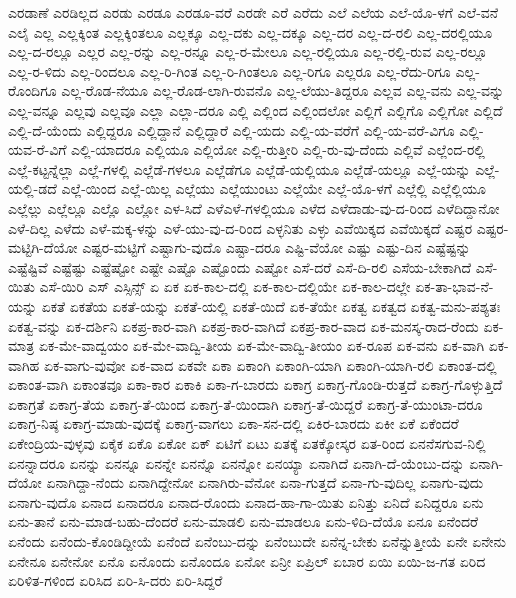 {ಎರಡಾಣೆ
ಎರಡಿಲ್ಲದ
ಎರಡು
ಎರಡೂ
ಎರಡೂ-ವರೆ
ಎರಡೇ
ಎರೆ
ಎರೆದು
ಎಲೆ
ಎಲೆಯ
ಎಲೆ-ಯೊ-ಳಗೆ
ಎಲೆ-ವನೆ
ಎಲೈ
ಎಲ್ಲ
ಎಲ್ಲಕ್ಕಿಂತ
ಎಲ್ಲಕ್ಕಿಂತಲೂ
ಎಲ್ಲಕ್ಕೂ
ಎಲ್ಲ-ದಕು
ಎಲ್ಲ-ದಕ್ಕೂ
ಎಲ್ಲ-ದರ
ಎಲ್ಲ-ದ-ರಲಿ
ಎಲ್ಲ-ದರಲ್ಲಿಯೂ
ಎಲ್ಲ-ದ-ರಲ್ಲೂ
ಎಲ್ಲರ
ಎಲ್ಲ-ರನ್ನು
ಎಲ್ಲ-ರನ್ನೂ
ಎಲ್ಲ-ರ-ಮೇಲೂ
ಎಲ್ಲ-ರಲ್ಲಿಯೂ
ಎಲ್ಲ-ರಲ್ಲಿ-ರುವ
ಎಲ್ಲ-ರಲ್ಲೂ
ಎಲ್ಲ-ರ-ಳಿದು
ಎಲ್ಲ-ರಿಂದಲೂ
ಎಲ್ಲ-ರಿ-ಗಿಂತ
ಎಲ್ಲ-ರಿ-ಗಿಂತಲೂ
ಎಲ್ಲ-ರಿಗೂ
ಎಲ್ಲರೂ
ಎಲ್ಲ-ರೆದು-ರಿಗೂ
ಎಲ್ಲ-ರೊಂದಿಗೂ
ಎಲ್ಲ-ರೊಡ-ನೆಯೂ
ಎಲ್ಲ-ರೊಡ-ಲಾಗಿ-ರುವನೊ
ಎಲ್ಲ-ಲೆಯು-ತಿದ್ದರೂ
ಎಲ್ಲವ
ಎಲ್ಲ-ವನು
ಎಲ್ಲ-ವನ್ನು
ಎಲ್ಲ-ವನ್ನೂ
ಎಲ್ಲವು
ಎಲ್ಲವೂ
ಎಲ್ಲಾ
ಎಲ್ಲಾ-ದರೂ
ಎಲ್ಲಿ
ಎಲ್ಲಿಂದ
ಎಲ್ಲಿಂದಲೋ
ಎಲ್ಲಿಗೆ
ಎಲ್ಲಿಗೊ
ಎಲ್ಲಿಗೋ
ಎಲ್ಲಿದೆ
ಎಲ್ಲಿ-ದೆ-ಯೆಂದು
ಎಲ್ಲಿದ್ದರೂ
ಎಲ್ಲಿದ್ದಾನೆ
ಎಲ್ಲಿದ್ದಾರೆ
ಎಲ್ಲಿ-ಯದು
ಎಲ್ಲಿ-ಯ-ವರೆಗೆ
ಎಲ್ಲಿ-ಯ-ವರೆ-ವಿಗೂ
ಎಲ್ಲಿ-ಯವ-ರೆ-ವಿಗೆ
ಎಲ್ಲಿ-ಯಾದರೂ
ಎಲ್ಲಿಯೂ
ಎಲ್ಲಿಯೋ
ಎಲ್ಲಿ-ರುತ್ತೀರಿ
ಎಲ್ಲಿ-ರು-ವು-ದೆಂದು
ಎಲ್ಲಿವೆ
ಎಲ್ಲೆಂದ-ರಲ್ಲಿ
ಎಲ್ಲೆ-ಕಟ್ಟನ್ನೆಲ್ಲಾ
ಎಲ್ಲೆ-ಗಳಲ್ಲಿ
ಎಲ್ಲೆಡೆ-ಗಳಲೂ
ಎಲ್ಲೆಡೆಗೂ
ಎಲ್ಲೆಡೆ-ಯಲ್ಲಿಯೂ
ಎಲ್ಲೆಡೆ-ಯಲ್ಲೂ
ಎಲ್ಲೆ-ಯನ್ನು
ಎಲ್ಲೆ-ಯಲ್ಲಿ-ಡದೆ
ಎಲ್ಲೆ-ಯಿಂದ
ಎಲ್ಲೆ-ಯಿಲ್ಲ
ಎಲ್ಲೆಯು
ಎಲ್ಲೆಯುಂಟು
ಎಲ್ಲೆಯೇ
ಎಲ್ಲೆ-ಯೊ-ಳಗೆ
ಎಲ್ಲೆಲ್ಲಿ
ಎಲ್ಲೆಲ್ಲಿಯೂ
ಎಲ್ಲೆಲ್ಲು
ಎಲ್ಲೆಲ್ಲೂ
ಎಲ್ಲೊ
ಎಲ್ಲೋ
ಎಳ-ಸಿದೆ
ಎಳೆಎಳೆ-ಗಳಲ್ಲಿಯೂ
ಎಳೆದ
ಎಳೆದಾಡು-ವು-ದ-ರಿಂದ
ಎಳೆದಿದ್ದಾನೋ
ಎಳೆ-ದಿಲ್ಲ
ಎಳೆದು
ಎಳೆ-ಮಕ್ಕ-ಳನ್ನು
ಎಳೆ-ಯು-ವು-ದ-ರಿಂದ
ಎಳ್ಳನಿತು
ಎಳ್ಳು
ಎವೆಯಿಕ್ಕದ
ಎವೆಯಿಕ್ಕದೆ
ಎಷ್ಟರ
ಎಷ್ಟರ-ಮಟ್ಟಿಗಿ-ದೆಯೋ
ಎಷ್ಟರ-ಮಟ್ಟಿಗೆ
ಎಷ್ಟಾಗು-ವುದೊ
ಎಷ್ಟಾ-ದರೂ
ಎಷ್ಟಿ-ವೆಯೋ
ಎಷ್ಟು
ಎಷ್ಟು-ದಿನ
ಎಷ್ಟೆಷ್ಟನ್ನು
ಎಷ್ಟೆಷ್ಟಿವೆ
ಎಷ್ಟೆಷ್ಟು
ಎಷ್ಟೆಷ್ಟೋ
ಎಷ್ಟೇ
ಎಷ್ಟೊ
ಎಷ್ಟೊಂದು
ಎಷ್ಟೋ
ಎಸೆ-ದರೆ
ಎಸೆ-ದಿ-ರಲಿ
ಎಸೆಯ-ಬೇಕಾಗಿದೆ
ಎಸೆ-ಯಿತು
ಎಸೆ-ಯಿರಿ
ಎಸ್
ಎಸ್ಸಿನ್ಸ್
ಏ
ಏಕ
ಏಕ-ಕಾಲ-ದಲ್ಲಿ
ಏಕ-ಕಾಲ-ದಲ್ಲಿಯೇ
ಏಕ-ಕಾಲ-ದಲ್ಲೇ
ಏಕ-ತಾ-ಭಾವ-ನೆ-ಯನ್ನು
ಏಕತೆ
ಏಕತೆಯ
ಏಕತೆ-ಯನ್ನು
ಏಕತೆ-ಯಲ್ಲಿ
ಏಕತೆ-ಯಿದೆ
ಏಕ-ತೆಯೇ
ಏಕತ್ವ
ಏಕತ್ವದ
ಏಕತ್ವ-ಮನು-ಪಶ್ಯತಃ
ಏಕತ್ವ-ವನ್ನು
ಏಕ-ದರ್ಶಿನಿ
ಏಕಪ್ರ-ಕಾರ-ವಾಗಿ
ಏಕಪ್ರ-ಕಾರ-ವಾಗಿದೆ
ಏಕಪ್ರ-ಕಾರ-ವಾದ
ಏಕ-ಮನಸ್ಕ-ರಾದ-ರೆಂದು
ಏಕ-ಮಾತ್ರ
ಏಕ-ಮೇ-ವಾದ್ವಯಂ
ಏಕ-ಮೇ-ವಾದ್ವಿ-ತೀಯ
ಏಕ-ಮೇ-ವಾದ್ವಿ-ತೀಯಂ
ಏಕ-ರೂಪ
ಏಕ-ವನು
ಏಕ-ವಾಗಿ
ಏಕ-ವಾಗಿಹ
ಏಕ-ವಾಗು-ವುವೋ
ಏಕ-ವಾದ
ಏಕವೇ
ಏಕಾ
ಏಕಾಂಗಿ
ಏಕಾಂಗಿ-ಯಾಗಿ
ಏಕಾಂಗಿ-ಯಾಗಿ-ರಲಿ
ಏಕಾಂತ-ದಲ್ಲಿ
ಏಕಾಂತ-ವಾಗಿ
ಏಕಾಂತವೂ
ಏಕಾ-ಕಾರ
ಏಕಾಕಿ
ಏಕಾ-ಗ-ಬಾರದು
ಏಕಾಗ್ರ
ಏಕಾಗ್ರ-ಗೊಂಡಿ-ರುತ್ತದೆ
ಏಕಾಗ್ರ-ಗೊಳ್ಳುತ್ತಿದೆ
ಏಕಾಗ್ರತೆ
ಏಕಾಗ್ರ-ತೆಯ
ಏಕಾಗ್ರ-ತೆ-ಯಿಂದ
ಏಕಾಗ್ರ-ತೆ-ಯಿಂದಾಗಿ
ಏಕಾಗ್ರ-ತೆ-ಯಿದ್ದರೆ
ಏಕಾಗ್ರ-ತೆ-ಯುಂಟಾ-ದರೂ
ಏಕಾಗ್ರ-ನಿಷ್ಠ
ಏಕಾಗ್ರ-ಮಾಡು-ವುದಕ್ಕೆ
ಏಕಾಗ್ರ-ವಾಗಲು
ಏಕಾ-ಸನ-ದಲ್ಲಿ
ಏಕಿರ-ಬಾರದು
ಏಕೀ
ಏಕೆ
ಏಕೆಂದರೆ
ಏಕೇಂದ್ರಿಯ-ವುಳ್ಳವು
ಏಕೈಕ
ಏಕೊ
ಏಕೋ
ಏಕ್
ಏಟಿಗೆ
ಏಟು
ಏತಕ್ಕೆ
ಏತಕ್ಕೋಸ್ಕರ
ಏತ-ರಿಂದ
ಏನನೆಸಗುವ-ನಿಲ್ಲಿ
ಏನನ್ನಾದರೂ
ಏನನ್ನು
ಏನನ್ನೂ
ಏನನ್ನೇ
ಏನನ್ನೊ
ಏನನ್ನೋ
ಏನಯ್ಯಾ
ಏನಾಗಿದೆ
ಏನಾಗಿ-ದೆ-ಯೆಂಬು-ದನ್ನು
ಏನಾಗಿ-ದೆಯೋ
ಏನಾಗಿದ್ದಾ-ನೆಂದು
ಏನಾಗಿದ್ದೇನೋ
ಏನಾಗಿರು-ವೆನೋ
ಏನಾ-ಗುತ್ತದೆ
ಏನಾ-ಗು-ವುದಿಲ್ಲ
ಏನಾಗು-ವುದು
ಏನಾಗು-ವುದೊ
ಏನಾದ
ಏನಾದರೂ
ಏನಾದ-ರೊಂದು
ಏನಾದ-ಹಾ-ಗಾ-ಯಿತು
ಏನಿತ್ತು
ಏನಿದೆ
ಏನಿದ್ದರೂ
ಏನು
ಏನು-ತಾನೆ
ಏನು-ಮಾಡ-ಬಹು-ದೆಂದರೆ
ಏನು-ಮಾಡಲಿ
ಏನು-ಮಾಡಲೂ
ಏನು-ಳಿದಿ-ದೆಯೊ
ಏನೂ
ಏನೆಂದರೆ
ಏನೆಂದು
ಏನೆಂದು-ಕೊಂಡಿದ್ದೀಯೆ
ಏನೆಂದೆ
ಏನೆಂಬು-ದನ್ನು
ಏನೆಂಬುದೇ
ಏನೆನ್ನ-ಬೇಕು
ಏನೆನ್ನುತ್ತೀಯೆ
ಏನೇ
ಏನೇನು
ಏನೇನೂ
ಏನೇನೋ
ಏನೊ
ಏನೊಂದು
ಏನೊಂದೂ
ಏನೋ
ಏನ್ರೀ
ಏಪ್ರಿಲ್
ಏಬಾರ
ಏಯಿ
ಏಯಿ-ಜ-ಗತ
ಏರಿದ
ಏರಿಳಿತ-ಗಳಿಂದ
ಏರಿಸಿದ
ಏರಿ-ಸಿ-ದರು
ಏರಿ-ಸಿದ್ದರೆ
}
